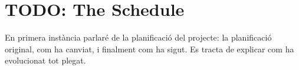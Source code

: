  
\section{TODO: The Schedule}

En primera instància parlaré de la planificació del projecte: la planificació
original, com ha canviat, i finalment com ha sigut. Es tracta de explicar com
ha evolucionat tot plegat.
